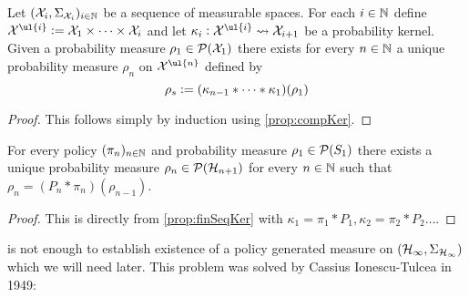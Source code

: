 \documentclass{article}
\begin{document}
\begin{prop}
  Let $(\mathcal{X}_i, \Sigma_{\mathcal{X}_i})_{i \in \mathbb{N}}$ be a sequence
  of measurable spaces. For each $i \in \mathbb{N}$ define
  $\Cal{X}^{\ul{i}} \defeq \Cal{X}_1 \times \dots \times \Cal{X}_i$
  and let
  $\kappa_i : \Cal{X}^{\ul{i}} \leadsto \Cal{X}_{i+1}$ be a probability kernel.
  Given a probability measure $\rho_1 \in \mathcal{P}(\mathcal{X}_1)$
  there exists for every $n \in \mathbb{N}$ a unique probability measure 
  $\rho_n$ on $\Cal{X}^{\ul{n}}$ defined by
  \[ \rho_s \vcentcolon= (\kappa_{n-1} * \dots * \kappa_1)(\rho_1) \]
  \label{prop:finSeqKer}
\end{prop}
\vspace*{-10mm}
\begin{proof}
  This follows simply by induction using \cref{prop:compKer}.
\end{proof}

\begin{prop}
  For every policy $(\pi_n)_{n \in \mathbb{N}}$ and probability measure
  $\rho_1 \in \mathcal{P}(S_1)$
  there exists a unique probability measure
  $\rho_n \in \mathcal{P}(\mathcal{H}_{n+1})$ for every $n \in \mathbb{N}$
  such that
  $\rho_n = (P_n * \pi_n)(\rho_{n-1})$.
  \label{prop:finPolProc}
\end{prop}
\begin{proof}
  This is directly from \cref{prop:finSeqKer} with
  $\kappa_1 = \pi_1 * P_1, \kappa_2 = \pi_2 * P_2 \dots$.
\end{proof}

 is not enough to establish existence of a
policy generated measure on
$(\mathcal{H}_\infty, \Sigma_{\mathcal{H}_\infty})$ 
which we will need later.
This problem was solved by Cassius Ionescu-Tulcea in 1949:
\end{document}
